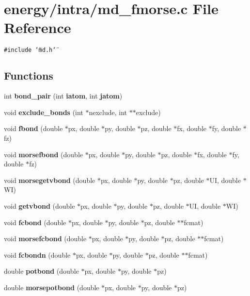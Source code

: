 \section{energy/intra/md\_\-fmorse.c File Reference}
\label{md__fmorse_8c}
{\tt \#include \char`\"{}md.h\char`\"{}}\par
\subsection*{Functions}
\begin{CompactItemize}
\item 
int {\bf bond\_\-pair} (int {\bf iatom}, int {\bf jatom})
\item 
void {\bf exclude\_\-bonds} (int $\ast$nexclude, int $\ast$$\ast$exclude)
\item 
void {\bf fbond} (double $\ast$px, double $\ast$py, double $\ast$pz, double $\ast$fx, double $\ast$fy, double $\ast$fz)
\item 
void {\bf morsefbond} (double $\ast$px, double $\ast$py, double $\ast$pz, double $\ast$fx, double $\ast$fy, double $\ast$fz)
\item 
void {\bf morsegetvbond} (double $\ast$px, double $\ast$py, double $\ast$pz, double $\ast$UI, double $\ast$WI)
\item 
void {\bf getvbond} (double $\ast$px, double $\ast$py, double $\ast$pz, double $\ast$UI, double $\ast$WI)
\item 
void {\bf fcbond} (double $\ast$px, double $\ast$py, double $\ast$pz, double $\ast$$\ast$fcmat)
\item 
void {\bf morsefcbond} (double $\ast$px, double $\ast$py, double $\ast$pz, double $\ast$$\ast$fcmat)
\item 
void {\bf fcbondn} (double $\ast$px, double $\ast$py, double $\ast$pz, double $\ast$$\ast$fcmat)
\item 
double {\bf potbond} (double $\ast$px, double $\ast$py, double $\ast$pz)
\item 
double {\bf morsepotbond} (double $\ast$px, double $\ast$py, double $\ast$pz)
\end{CompactItemize}
